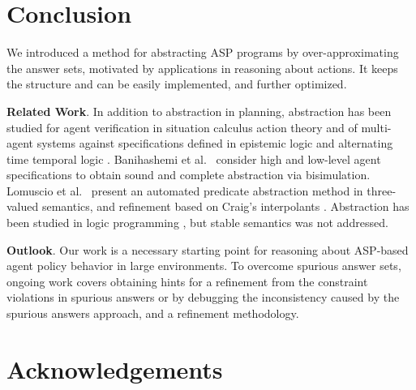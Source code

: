 \documentclass{new_tlp}
\newcommand{\citeNBYB}[1]{\citeauthor{#1}~\shortcite{#1}}
\newcommand{\citeNselfBYB}[2]{{#1}~\citeyear{#2}}
\newcommand{\leanparagraph}[1]{\smallskip\noindent\textbf{#1}. }
\begin{document}
\section{Conclusion}

We introduced a    
method for abstracting ASP programs by
over-approximating the answer sets, motivated by applications in
reasoning about actions. It keeps the structure and can be easily implemented, and further optimized.

\leanparagraph{Related Work}
In addition to %
abstraction in planning, 
abstraction has %
been studied
for agent verification 
in situation
calculus action theory \cite{banihashemi2017abstraction} %
and of
multi-agent systems against specifications 
defined in epistemic
logic \cite{lomuscio2016verification} and alternating time temporal logic
\cite{belardinelli2016abstraction}. 
\citeNselfBYB{Banihashemi et al.}{banihashemi2017abstraction}
consider high and low-level agent specifications 
to obtain sound and complete abstraction via bisimulation.
\citeNselfBYB{Lomuscio et al.}{lomuscio2016verification} present an automated
predicate abstraction method in three-valued
semantics, %
and refinement based on Craig’s interpolants \cite{belardinelli2016agent}.
Abstraction has been studied in logic
programming \cite{COUSOT1992103}, but stable semantics 
was not addressed.  

\leanparagraph{Outlook} 
Our work is a necessary starting point for
reasoning about ASP-based agent policy behavior in large environments. To
overcome
spurious answer sets, ongoing work covers
obtaining hints for a refinement 
from the constraint violations in
spurious answers or by debugging 
the inconsistency caused by the spurious
answers approach, and a refinement methodology.

\section*{Acknowledgements}
\end{document}
